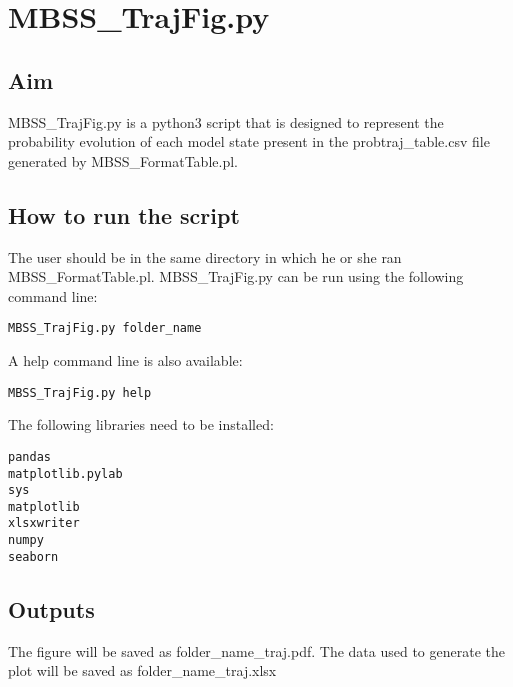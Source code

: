 \documentclass{article}
\begin{document}
\section*{MBSS\_TrajFig.py}
\subsection*{Aim}
MBSS\_TrajFig.py is a python3 script that is designed to represent the probability evolution of each model state present in the probtraj\_table.csv file generated by MBSS\_FormatTable.pl. 

\subsection*{How to run the script}
The user should be in the same directory in which he or she ran MBSS\_FormatTable.pl. MBSS\_TrajFig.py can be run using the following command line: 
\begin{verbatim}
MBSS_TrajFig.py folder_name
\end{verbatim}
 A help command line is also available:
\begin{verbatim} 
MBSS_TrajFig.py help
\end{verbatim}
The following libraries need to be installed:
\begin{verbatim}
pandas
matplotlib.pylab
sys
matplotlib
xlsxwriter
numpy
seaborn
\end{verbatim}


\subsection*{Outputs}
The figure will be saved as folder\_name\_traj.pdf.
The data used to generate the plot will be saved as folder\_name\_traj.xlsx
\end{document}
